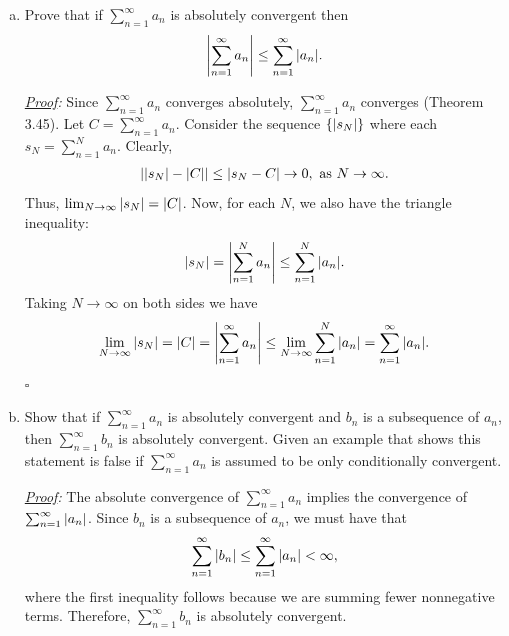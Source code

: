 \documentclass[11pt]{article}
\begin{document}
\begin{enumerate}[(a)]
	\item Prove that if $\sum^\infty_{n=1}a_n$ is absolutely convergent then 
	\begin{align*}
	\abs{\sum^\infty_{n=1}a_n} \leq \sum^\infty_{n=1}\abs{a_n}.
	\end{align*} 
	
	
	
	\noindent \textit{\underline{Proof}:} Since $\sum^\infty_{n=1}a_n$ converges absolutely, $\sum^\infty_{n=1}a_n$ converges (Theorem 3.45). Let $C = \sum^\infty_{n=1}a_n$. Consider the sequence $\{\abs{s_N}\}$ where each $s_N = {\sum^{N}_{n=1}a_n}$.  Clearly, 
	\begin{align*}
	\abs{\abs{s_N} - \abs{C}} \leq \abs{ s_N - C} \to 0, \mbox{ as } N\to \infty.
	\end{align*}
	Thus, $\lim_{N\to \infty}\abs{s_N} = \abs{C}$. Now, for each $N$, we also have the triangle inequality:
	\begin{align*}
	\abs{s_N} = \abs{\sum^N_{n=1}a_n} \leq \sum^N_{n=1}\abs{a_n}.
	\end{align*}
	Taking $N\to \infty$ on both sides we have
	\begin{align*}
	\lim_{N\to \infty}\abs{s_N} = \abs{C} =  \abs{\sum^\infty_{n=1}a_n} \leq \lim_{N\to \infty} \sum^N_{n=1}\abs{a_n} = \sum^\infty_{n=1}\abs{a_n}.
	\end{align*}
 	\hfill $\square$
	
	
	
	
	
	
	
	
	
	
	
	
	
	
	
	
	
	
	
	
	
	\item Show that if $\sum^\infty_{n=1}a_n$ is absolutely convergent and $b_n$ is a subsequence of $a_n$, then $\sum^\infty_{n=1}b_n$ is absolutely convergent. Given an example that shows this statement is false if $\sum^\infty_{n=1}a_n$ is assumed to be only conditionally convergent. 
	
	
	
	\noindent \textit{\underline{Proof}:} The absolute convergence of $\sum^\infty_{n=1}a_n$ implies the convergence of $\sum^\infty_{n=1}\abs{a_n}$. Since $b_n$ is a subsequence of $a_n$, we must have that
	\begin{align*}
	\sum^\infty_{n=1}\abs{b_n} \leq \sum^\infty_{n=1}\abs{a_n} < \infty, 
	\end{align*} 
	where the first inequality follows because we are summing fewer nonnegative terms. Therefore, $\sum^\infty_{n=1}b_n$ is absolutely convergent. 
	

\end{enumerate}
\end{document}
